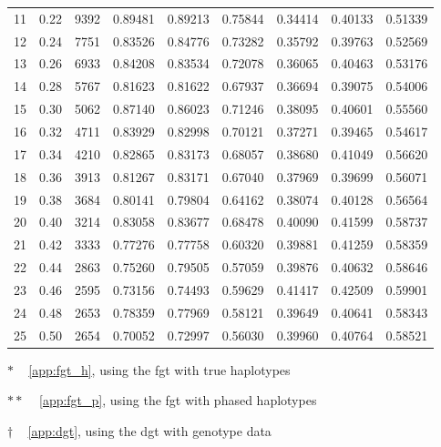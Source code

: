 \begin{table}[!htb]
\begin{threeparttable}
\begin{tabular}{ccS[table-format=6.1]*6{S[table-format=1.3]}}
11 & 0.22 &  9392 & 0.89481 & 0.89213 & 0.75844 & 0.34414 & 0.40133 & 0.51339 \\
12 & 0.24 &  7751 & 0.83526 & 0.84776 & 0.73282 & 0.35792 & 0.39763 & 0.52569 \\
13 & 0.26 &  6933 & 0.84208 & 0.83534 & 0.72078 & 0.36065 & 0.40463 & 0.53176 \\
14 & 0.28 &  5767 & 0.81623 & 0.81622 & 0.67937 & 0.36694 & 0.39075 & 0.54006 \\
15 & 0.30 &  5062 & 0.87140 & 0.86023 & 0.71246 & 0.38095 & 0.40601 & 0.55560 \\
16 & 0.32 &  4711 & 0.83929 & 0.82998 & 0.70121 & 0.37271 & 0.39465 & 0.54617 \\
17 & 0.34 &  4210 & 0.82865 & 0.83173 & 0.68057 & 0.38680 & 0.41049 & 0.56620 \\
18 & 0.36 &  3913 & 0.81267 & 0.83171 & 0.67040 & 0.37969 & 0.39699 & 0.56071 \\
19 & 0.38 &  3684 & 0.80141 & 0.79804 & 0.64162 & 0.38074 & 0.40128 & 0.56564 \\
20 & 0.40 &  3214 & 0.83058 & 0.83677 & 0.68478 & 0.40090 & 0.41599 & 0.58737 \\
21 & 0.42 &  3333 & 0.77276 & 0.77758 & 0.60320 & 0.39881 & 0.41259 & 0.58359 \\
22 & 0.44 &  2863 & 0.75260 & 0.79505 & 0.57059 & 0.39876 & 0.40632 & 0.58646 \\
23 & 0.46 &  2595 & 0.73156 & 0.74493 & 0.59629 & 0.41417 & 0.42509 & 0.59901 \\
24 & 0.48 &  2653 & 0.78359 & 0.77969 & 0.58121 & 0.39649 & 0.40641 & 0.58343 \\
25 & 0.50 &  2654 & 0.70052 & 0.72997 & 0.56030 & 0.39960 & 0.40764 & 0.58521 \\
\bottomrule
\end{tabular}
\begin{tablenotes}\footnotesize
	\item[$\ast$] ~ \cref{app:fgt_h}, using the \gls{fgt} with true haplotypes
	\item[$\ast\ast$] ~ \cref{app:fgt_p}, using the \gls{fgt} with phased haplotypes
	\item[$\dagger$] ~ \cref{app:dgt}, using the \gls{dgt} with genotype data
\end{tablenotes}
\end{threeparttable}
\end{table}


